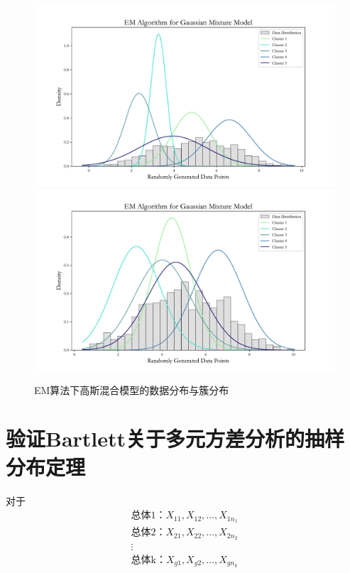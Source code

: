 \documentclass{article} %
\begin{document}
\begin{figure}[H]
    \centering
    \includegraphics[width=\textwidth]{./img/EM_Gaussian_Mixture_Model.pdf}
    \includegraphics[width=\textwidth]{./img/em2.pdf}
    \caption{EM算法下高斯混合模型的数据分布与簇分布}
    \label{fig:EM_Gaussian_Mixture_Model}
\end{figure}

\section{验证Bartlett关于多元方差分析的抽样分布定理}
对于
\[
\begin{gathered}
    \text{总体1：}X_{11},X_{12},\hdots,X_{1n_1}\\
    \text{总体2：}X_{21},X_{22},\hdots,X_{2n_2}\\
    \vdots\\
    \text{总体k：}X_{g1},X_{g2},\hdots,X_{gn_k}\\
\end{gathered}
\]
\end{document}
